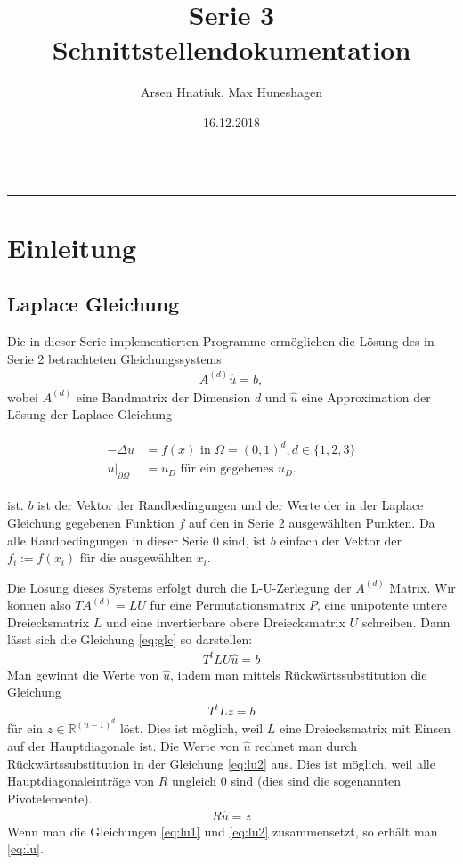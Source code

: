 \documentclass[letterpaper,10pt,ngerman, oneside, openright]{sphinxmanual}
\title{Serie 3 Schnittstellendokumentation}
\date{16.12.2018}
\author{Arsen Hnatiuk, Max Huneshagen}
\begin{document}
\maketitle
\tableofcontents
\bigskip

\hrule
\hrule


\chapter{Einleitung}

\section{Laplace Gleichung}
Die in dieser Serie implementierten Programme ermöglichen die Lösung des in Serie 2 betrachteten Gleichungssystems
\begin{align}
A^{(d)}\hat{u} = b,
\label{eq:glc}
\end{align}
wobei $A^{(d)}$ eine Bandmatrix der Dimension $d$ und $\hat{u}$ eine Approximation der Lösung der Laplace-Gleichung

\begin{align}
\begin{split}
-\Delta u&=f(x)\text{ in }\Omega=(0, 1)^d, d\in\{1,2,3\}\\
u \vert _{\partial\Omega}&=u_D\text{ für ein gegebenes }u_D.
\end{split}
\label{eq:rwp}
\end{align}


ist. $b$ ist der Vektor der Randbedingungen und der Werte der in der Laplace Gleichung gegebenen Funktion $f$ auf den in Serie 2 ausgewählten Punkten. Da alle Randbedingungen in dieser Serie $0$ sind, ist $b$ einfach der Vektor der $f_i := f(x_i)$ für die ausgewählten $x_i$. 

Die Lösung dieses Systems erfolgt durch die L-U-Zerlegung der $A^{(d)}$ Matrix. Wir können also $TA^{(d)}=LU$ für eine Permutationsmatrix $P$, eine unipotente untere Dreiecksmatrix $L$ und eine invertierbare obere Dreiecksmatrix $U$ schreiben. Dann lässt sich die Gleichung \ref{eq:glc} so darstellen:
\begin{align}
T^tLU\hat{u}=b
\label{eq:lu}
\end{align}
Man gewinnt die Werte von $\hat{u}$, indem man mittels Rückwärtssubstitution die Gleichung 
\begin{align}
T^tLz=b
\label{eq:lu1}
\end{align}
für ein $z\in \mathbb{R}^{(n-1)^d}$ löst. Dies ist möglich, weil $L$ eine Dreiecksmatrix mit Einsen auf der Hauptdiagonale ist. Die Werte von $\hat{u}$ rechnet man durch Rückwärtssubstitution in der Gleichung \eqref{eq:lu2} aus. Dies ist möglich, weil alle Hauptdiagonaleinträge von $R$ ungleich $0$ sind (dies sind die sogenannten Pivotelemente).
\begin{align}
R\hat{u}=z
\label{eq:lu2}
\end{align}
Wenn man die Gleichungen \eqref{eq:lu1} und \eqref{eq:lu2} zusammensetzt, so erhält man \eqref{eq:lu}.
\end{document}
